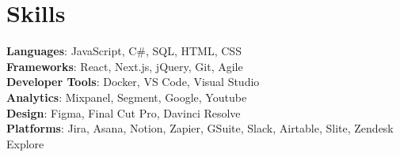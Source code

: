\section{Skills}
\begin{itemize}[leftmargin=0.15in, label={}]
    \small{
      \item{
      \textbf{Languages}{: JavaScript, C\#, SQL, HTML, CSS} \\
      \textbf{Frameworks}{: React, Next.js, jQuery, Git, Agile} \\
      \textbf{Developer Tools}{: Docker, VS Code, Visual Studio} \\
      \textbf{Analytics}{: Mixpanel, Segment, Google, Youtube} \\
      \textbf{Design}{: Figma, Final Cut Pro, Davinci Resolve} \\
      \textbf{Platforms}{: Jira, Asana, Notion, Zapier, GSuite, Slack, Airtable, Slite, Zendesk Explore} \\
      }
    }
  \end{itemize}